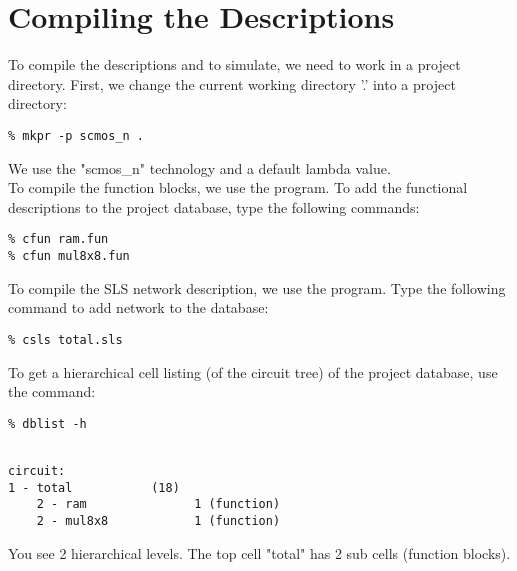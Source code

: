 \section{Compiling the Descriptions}
To compile the descriptions and to simulate, we need to work in a project directory.
First, we change the current working directory '.' into a project directory:
\small
\begin{Verbatim}
% mkpr -p scmos_n .
\end{Verbatim}
\normalsize
We use the "scmos\_n" technology and a default lambda value.
\\[1 ex]
To compile the function blocks, we use the  program.
To add the functional descriptions to the project database, type the following commands:
\small
\begin{Verbatim}
% cfun ram.fun
% cfun mul8x8.fun
\end{Verbatim}
\normalsize
To compile the SLS network description, we use the  program.
Type the following command to add network  to the database:
\small
\begin{Verbatim}
% csls total.sls
\end{Verbatim}
\normalsize
To get a hierarchical cell listing (of the circuit tree) of the project database,
use the  command:
\small
\begin{Verbatim}
% dblist -h
\end{Verbatim}
\normalsize
\small \begin{Verbatim}[frame=single]

circuit:
1 - total           (18)
    2 - ram               1 (function)
    2 - mul8x8            1 (function)

\end{Verbatim}
\normalsize
You see 2 hierarchical levels.
The top cell "total" has 2 sub cells (function blocks).

